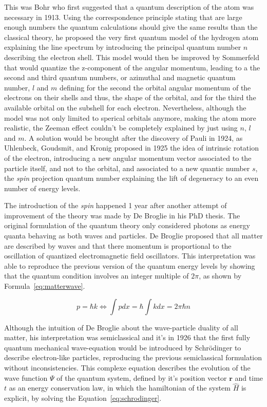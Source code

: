 	This was Bohr who first suggested that a quantum description of the atom was necessary in 1913. Using the correspondence principle stating that are large enough numbers the quantum calculations should give the same results than the classical theory, he proposed the very first quantum model of the hydrogen atom explaining the line spectrum by introducing the principal quantum number $n$ describing the electron shell. This model would then be improved by Sommerfeld that would quantize the z-component of the angular momentum, leading to a the second and third quantum numbers, or azimuthal and magnetic quantum number, $l$ and $m$ defining for the second the orbital angular momentum of the electrons on their shells and thus, the shape of the orbital, and for the third the available orbital on the subshell for each electron. Nevertheless, although the model was not only limited to sperical orbitals anymore, making the atom more realistic, the Zeeman effect couldn't be completely explained by just using $n$, $l$ and $m$. A solution would be brought after the discovery of Pauli in 1924, as Uhlenbeck, Goudsmit, and Kronig proposed in 1925 the idea of intrinsic rotation of the electron, introducing a new angular momentum vector associated to the particle itself, and not to the orbital, and associated to a new quantic number $s$, the \textit{spin} projection quantum number explaining the lift of degeneracy to an even number of energy levels.
	
	The introduction of the \textit{spin} happened 1 year after another attempt of improvement of the theory was made by De Broglie in his PhD thesis. The original formulation of the quantum theory only considered photons as energy quanta behaving as both waves and particles. De Broglie proposed that all matter are described by waves and that there momentum is proportional to the oscillation of quantized electromagnetic field oscillators. This interpretation was able to reproduce the previous version of the quantum energy levels by showing that the quantum condition involves an integer multiple of $2\pi$, as shown by Formula~\ref{eq:matterwave}.
	
	\begin{equation}
		\label{eq:matterwave}
		p = \hbar k \Leftrightarrow \int p dx = \hbar\int k dx = 2\pi\hbar n
	\end{equation}
	
	Although the intuition of De Broglie about the wave-particle duality of all matter, his interpretation was semiclassical and it's in 1926 that the first fully quantum mechanical wave-equation would be introduced by Schrödinger to describe electron-like particles, reproducing the previous semiclassical formulation without inconsistencies. This complexe equation describes the evolution of the wave function $\Psi$ of the quantum system, defined by it's position vector $\mathbf{r}$ and time $t$ as an energy conservation law, in which the hamiltonian of the system $\hat{H}$ is explicit, by solving the Equation~\ref{eq:schrodinger}.
	
